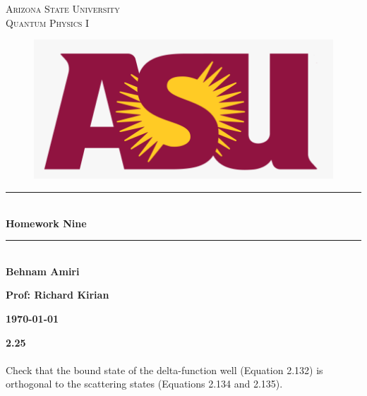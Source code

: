 \documentclass[fleqn]{article}
\begin{document}
  \begin{titlepage}

    \newcommand{\HRule}{\rule{\linewidth}{0.5mm}}

    \center


    \textsc{\LARGE Arizona State University}\\[1.5cm]

    \textsc{\LARGE Quantum Physics I }\\[1.5cm]


    \begin{figure}
      \includegraphics[width=\linewidth]{asu.png}
    \end{figure}


    \HRule \\[0.4cm]
    { \huge \bfseries Homework Nine}\\[0.4cm] 
    \HRule \\[1.5cm]

    \textbf{Behnam Amiri}

    \bigbreak

    \textbf{Prof: Richard Kirian}

    \bigbreak


    \textbf{{\large \today}\\[2cm]}

    \vfill 

  \end{titlepage}

  \textbf{2.25} \\ \\
  Check that the bound state of the delta-function well (Equation 2.132) is orthogonal to the 
  scattering states (Equations 2.134 and 2.135).
\end{document}
